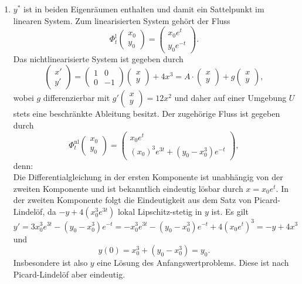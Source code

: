 \documentclass{article}
\begin{document}
\begin{enumerate}
\begin{center}
\end{center}
\item $y^*$ ist in beiden Eigenräumen enthalten und damit ein Sattelpunkt im linearen System.
Zum linearisierten System gehört der Fluss
\[
    \Phi_t^\mathrm{l}\begin{pmatrix}
        x_0\\y_0
    \end{pmatrix} = \begin{pmatrix}
        x_0e^t\\y_0e^{-t}
    \end{pmatrix}.
\]
Das nichtlinearisierte System ist gegeben durch
\[
    \begin{pmatrix}
        x'\\y'
    \end{pmatrix} = \begin{pmatrix}
        1&0\\0&-1
    \end{pmatrix} \begin{pmatrix}
        x\\y
    \end{pmatrix} + 4x^3 = A\cdot \begin{pmatrix}
        x\\y
    \end{pmatrix} + g\begin{pmatrix}
        x\\y
    \end{pmatrix},
\]
wobei $g$ differenzierbar mit $g'\begin{pmatrix}
    x\\y
\end{pmatrix} = 12x^2$ und daher auf einer Umgebung $U$ stets eine beschränkte Ableitung besitzt.
Der zugehörige Fluss ist gegeben durch
\[
    \Phi_t^\mathrm{nl}\begin{pmatrix}
        x_0\\y_0
    \end{pmatrix} = \begin{pmatrix}
        x_0e^t\\ (x_0)^3e^{3t} + (y_0 - x_0^3)e^{-t}
    \end{pmatrix},
\]
denn:\\
Die Differentialgleichung in der ersten Komponente ist unabhängig von der zweiten Komponente und ist bekanntlich eindeutig lösbar durch $x = x_0e^t$.
In der zweiten Komponente folgt die Eindeutigkeit aus dem Satz von Picard-Lindelöf, da $-y + 4(x_0^3e^{3t})$ lokal Lipschitz-stetig in $y$ ist.
Es gilt 
\[
    y' = 3x_0^3e^{3t} - (y_0 - x_0^3)e^{-t} = -x_0^3e^{3t} - (y_0-x_0^3)e^{-t} + 4(x_0e^t)^3 = -y + 4x^3
\]
und
\[
    y(0) = x_0^3 + (y_0 - x_0^3) = y_0.
\]
Insbesondere ist also $y$ eine Lösung des Anfangswertproblems. Diese ist nach Picard-Lindelöf aber eindeutig.


\end{enumerate}
\end{document}
